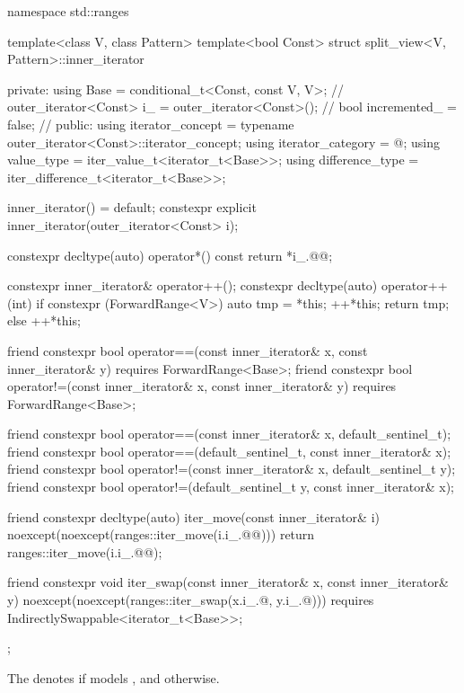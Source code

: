 \begin{codeblock}
namespace std::ranges {
  template<class V, class Pattern>
  template<bool Const>
  struct split_view<V, Pattern>::inner_iterator {
  private:
    using Base =
      conditional_t<Const, const V, V>;                 // \expos
    outer_iterator<Const> i_ = outer_iterator<Const>(); // \expos
    bool incremented_ = false;                          // \expos
  public:
    using iterator_concept  = typename outer_iterator<Const>::iterator_concept;
    using iterator_category = @\seebelow@;
    using value_type        = iter_value_t<iterator_t<Base>>;
    using difference_type   = iter_difference_t<iterator_t<Base>>;

    inner_iterator() = default;
    constexpr explicit inner_iterator(outer_iterator<Const> i);

    constexpr decltype(auto) operator*() const { return *i_.@@; }

    constexpr inner_iterator& operator++();
    constexpr decltype(auto) operator++(int) {
      if constexpr (ForwardRange<V>) {
        auto tmp = *this;
        ++*this;
        return tmp;
      } else
        ++*this;
    }

    friend constexpr bool operator==(const inner_iterator& x, const inner_iterator& y)
      requires ForwardRange<Base>;
    friend constexpr bool operator!=(const inner_iterator& x, const inner_iterator& y)
      requires ForwardRange<Base>;

    friend constexpr bool operator==(const inner_iterator& x, default_sentinel_t);
    friend constexpr bool operator==(default_sentinel_t, const inner_iterator& x);
    friend constexpr bool operator!=(const inner_iterator& x, default_sentinel_t y);
    friend constexpr bool operator!=(default_sentinel_t y, const inner_iterator& x);

    friend constexpr decltype(auto) iter_move(const inner_iterator& i)
    noexcept(noexcept(ranges::iter_move(i.i_.@@))) {
      return ranges::iter_move(i.i_.@@);
    }

    friend constexpr void iter_swap(const inner_iterator& x, const inner_iterator& y)
      noexcept(noexcept(ranges::iter_swap(x.i_.@, y.i_.@)))
      requires IndirectlySwappable<iterator_t<Base>>;
  };
}
\end{codeblock}

\pnum
The   denotes
 if
 models
, and 
otherwise.

